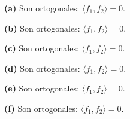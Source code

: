 \noindent\textbf{(a)} Son ortogonales: \(\langle f_1,f_2\rangle=0\).

\noindent\textbf{(b)} Son ortogonales: \(\langle f_1,f_2\rangle=0\).

\noindent\textbf{(c)} Son ortogonales: \(\langle f_1,f_2\rangle=0\).

\noindent\textbf{(d)} Son ortogonales: \(\langle f_1,f_2\rangle=0\).

\noindent\textbf{(e)} Son ortogonales: \(\langle f_1,f_2\rangle=0\).

\noindent\textbf{(f)} Son ortogonales: \(\langle f_1,f_2\rangle=0\).
